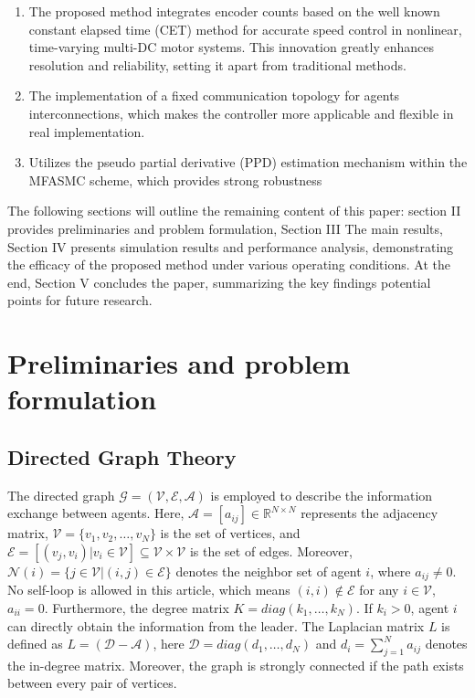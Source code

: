 \documentclass[journal,onecolumn]{IEEEtran}
\begin{document}
\begin{enumerate}

    \item The proposed method integrates encoder counts based on the well known constant elapsed time (CET) method\cite{31} for accurate speed control in nonlinear, time-varying multi-DC motor systems. This innovation greatly enhances resolution and reliability, setting it apart from traditional methods.
    
    \item The implementation of a fixed communication topology for agents interconnections, which makes the controller more applicable and flexible in real implementation.
    
    \item Utilizes the pseudo partial derivative (PPD) estimation mechanism within the MFASMC scheme, which provides strong robustness

\end{enumerate}



    The following sections will outline the remaining content of this paper:
    section II provides preliminaries and problem formulation, Section III The main results, Section IV presents simulation results and performance analysis, demonstrating the efficacy of the proposed method under various operating conditions.
    At the end, Section V concludes the paper, summarizing the key findings potential points for future research.


\section{Preliminaries and problem formulation}\label{section:2}
\subsection{Directed Graph Theory}

The directed graph $ \mathcal{G} = (\mathcal{V}, \mathcal{E}, \mathcal{A}) $ is employed to describe the information exchange between agents. Here, $ \mathcal{A} = [a_{ij}] \in \mathbb{R}^{N \times N} $ represents the adjacency matrix, $ \mathcal{V}=\{v_1, v_2,\dots,v_N\} $ is the set of vertices, and $ \mathcal{E} = [(v_j,v_i)|v_i \in \mathcal{V} ] \subseteq \mathcal{V} \times \mathcal{V}$ is the set of edges. Moreover, $ \mathcal{N}(i) = \{j \in \mathcal{V} |(i,j) \in \mathcal{E}\} $ denotes the neighbor set of agent $ i $, where $ a_{i j} \neq 0$. No self-loop is allowed in this article, which means $(i, i) \notin \mathcal{E}$ for any $ i \in \mathcal{V} $, $ a_{ii}=0$. Furthermore, the degree matrix $ K = diag(k_1,\dots,k_N)$. If $ k_i > 0$, agent $ i $ can directly obtain the information from the leader. The Laplacian matrix $ L $ is defined as $ L = (\mathcal{D}-\mathcal{A})$, here $\mathcal{D} = diag({d_1,\dots,d_N})$ and $d_i=\sum_{j=1}^{N} a_{i j}$ denotes the in-degree matrix. Moreover, the graph is strongly connected if the path exists between every pair of vertices.
\end{document}
